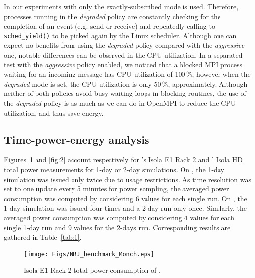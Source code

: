 In our experiments with \cosmoart only the exactly-subscribed mode  is
used. Therefore, \cosmoart processes running  in  the  \emph{degraded} 
policy are constantly checking for the completion  of  an  event (e.g. 
send or receive) and repeatedly calling to  \texttt{sched\_yield()} to 
be picked again by the Linux scheduler. Although one can expect no benefits 
from   using   the  \emph{degraded}   policy   compared   with     the 
\emph{aggressive} one, notable differences can be observed in the CPU utilization. 
In a separated  test  with  the  \emph{aggressive}  policy 
enabled, we noticed that a blocked MPI process waiting for an incoming 
message has CPU utilization of 100\,\%,  however  when  the \emph{degraded} 
mode  is  set,  the  CPU  utilization is only $50\,\%$, approximately. 
Although neither of both policies avoid busy-waiting loops in blocking 
routines, the use of the \emph{degraded} policy is as much as we can 
do in OpenMPI to reduce the CPU utilization, and thus save energy.


\subsection{Time-power-energy analysis}
\label{subsec:4.2}

Figures~\ref{fig:1} and \ref{fig:2}  account respectively for \monch's
Isola  E1 Rack 2  and \pilat'  Isola HD  total power  measurements for
1-day or 2-day simulations. On \monch, the 1-day simulation was issued
only twice due  to usage restrictions.  As time  resolution was set to
one  update every  5 minutes  for power  sampling, the  averaged power
consumption was computed by considering  6 values for each single run.
On \pilat, the 1-day simulation was  issued four times and a 2-day run
only once.  Similarly, the  averaged power consumption was computed by
considering 4  values for each single  1-day run and 9  values for the
2-days run. Corresponding results are gathered in Table~\ref{tab:1}.

\begin{figure}[htbf]
  \centering
  \texttt{[image: Figs/NRJ\_benchmark\_Monch.eps]}
  \caption{Isola E1 Rack 2 total power consumption of \monch.}
  \label{fig:1}
\end{figure}

